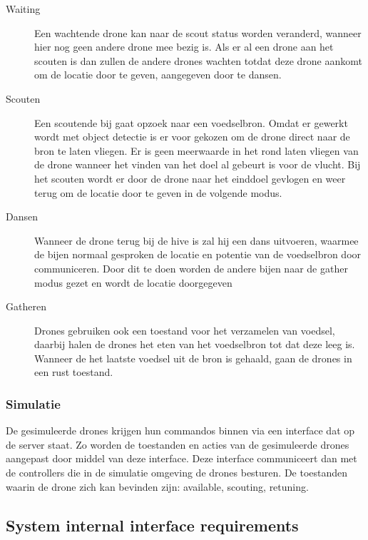 \begin{description}
    \item[Waiting]
    Een wachtende drone kan naar de scout status worden veranderd, wanneer hier nog geen andere drone mee bezig is.
    Als er al een drone aan het scouten is dan zullen de andere drones wachten totdat deze drone aankomt om de locatie
    door te geven, aangegeven door te dansen. 
    
    \item[Scouten]
    Een scoutende bij gaat opzoek naar een voedselbron. Omdat er gewerkt wordt met object detectie
    is er voor gekozen om de drone direct naar de bron te laten vliegen. Er is geen meerwaarde in het rond laten 
    vliegen van de drone wanneer het vinden van het doel al gebeurt is voor de vlucht. 
    Bij het scouten wordt er door de drone naar het einddoel gevlogen en weer terug om de locatie door te geven in de volgende modus.
    
    \item[Dansen]
    Wanneer de drone terug bij de hive is zal hij een dans uitvoeren, waarmee de bijen normaal gesproken 
    de locatie en potentie van de voedselbron door communiceren. Door dit te doen worden de andere bijen naar de gather modus gezet
    en wordt de locatie doorgegeven
    
    \item[Gatheren]  
    Drones gebruiken ook een toestand voor het verzamelen van voedsel, daarbij halen de drones het eten van het voedselbron tot dat deze leeg is.
    Wanneer de het laatste voedsel uit de bron is gehaald, gaan de drones in een rust toestand.
\end{description}

\subsubsection*{Simulatie}
De gesimuleerde drones krijgen hun commandos binnen via een interface dat op de server staat. Zo worden de toestanden en acties van de gesimuleerde drones
aangepast door middel van deze interface. Deze interface communiceert dan met de controllers die in de simulatie omgeving de drones besturen. De toestanden
waarin de drone zich kan bevinden zijn: available, scouting, retuning.


\subsection{System internal interface requirements}

